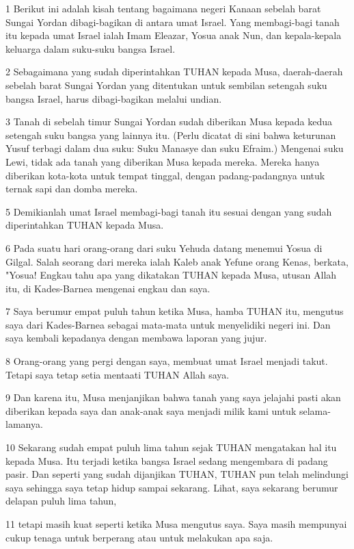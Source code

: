 \par 1 Berikut ini adalah kisah tentang bagaimana negeri Kanaan sebelah barat Sungai Yordan dibagi-bagikan di antara umat Israel. Yang membagi-bagi tanah itu kepada umat Israel ialah Imam Eleazar, Yosua anak Nun, dan kepala-kepala keluarga dalam suku-suku bangsa Israel.
\par 2 Sebagaimana yang sudah diperintahkan TUHAN kepada Musa, daerah-daerah sebelah barat Sungai Yordan yang ditentukan untuk sembilan setengah suku bangsa Israel, harus dibagi-bagikan melalui undian.
\par 3 Tanah di sebelah timur Sungai Yordan sudah diberikan Musa kepada kedua setengah suku bangsa yang lainnya itu. (Perlu dicatat di sini bahwa keturunan Yusuf terbagi dalam dua suku: Suku Manasye dan suku Efraim.) Mengenai suku Lewi, tidak ada tanah yang diberikan Musa kepada mereka. Mereka hanya diberikan kota-kota untuk tempat tinggal, dengan padang-padangnya untuk ternak sapi dan domba mereka.
\par 5 Demikianlah umat Israel membagi-bagi tanah itu sesuai dengan yang sudah diperintahkan TUHAN kepada Musa.
\par 6 Pada suatu hari orang-orang dari suku Yehuda datang menemui Yosua di Gilgal. Salah seorang dari mereka ialah Kaleb anak Yefune orang Kenas, berkata, "Yosua! Engkau tahu apa yang dikatakan TUHAN kepada Musa, utusan Allah itu, di Kades-Barnea mengenai engkau dan saya.
\par 7 Saya berumur empat puluh tahun ketika Musa, hamba TUHAN itu, mengutus saya dari Kades-Barnea sebagai mata-mata untuk menyelidiki negeri ini. Dan saya kembali kepadanya dengan membawa laporan yang jujur.
\par 8 Orang-orang yang pergi dengan saya, membuat umat Israel menjadi takut. Tetapi saya tetap setia mentaati TUHAN Allah saya.
\par 9 Dan karena itu, Musa menjanjikan bahwa tanah yang saya jelajahi pasti akan diberikan kepada saya dan anak-anak saya menjadi milik kami untuk selama-lamanya.
\par 10 Sekarang sudah empat puluh lima tahun sejak TUHAN mengatakan hal itu kepada Musa. Itu terjadi ketika bangsa Israel sedang mengembara di padang pasir. Dan seperti yang sudah dijanjikan TUHAN, TUHAN pun telah melindungi saya sehingga saya tetap hidup sampai sekarang. Lihat, saya sekarang berumur delapan puluh lima tahun,
\par 11 tetapi masih kuat seperti ketika Musa mengutus saya. Saya masih mempunyai cukup tenaga untuk berperang atau untuk melakukan apa saja.
